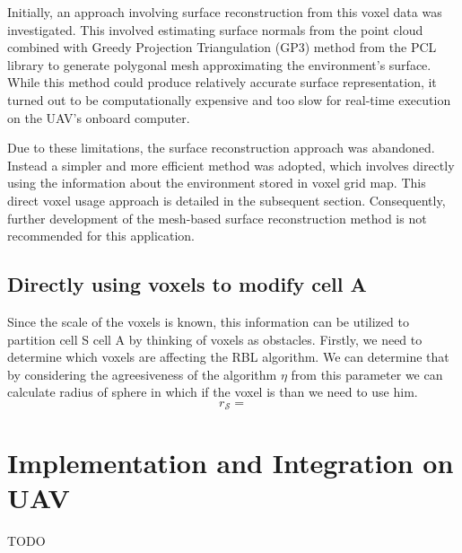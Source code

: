             Initially, an approach involving surface reconstruction from this voxel data was investigated. 
            This involved estimating surface normals from the point cloud combined with Greedy Projection Triangulation (GP3) method from the PCL library to generate polygonal mesh approximating the environment's surface.
            While this method could produce relatively accurate surface representation, it turned out to be computationally expensive and too slow for real-time execution on the \ac{UAV}'s onboard computer.

            Due to these limitations, the surface reconstruction approach was abandoned. 
            Instead a simpler and more efficient method was adopted, which involves directly using the information about the environment stored in voxel grid map.
            This direct voxel usage approach is detailed in the subsequent section. 
            Consequently, further development of the mesh-based surface reconstruction method is not recommended for this application.

        \subsection{Directly using voxels to modify cell A}
            Since the scale of the voxels is known, this information can be utilized to partition cell S cell A by thinking of voxels as obstacles.
            Firstly, we need to determine which voxels are affecting the RBL algorithm.
            We can determine that by considering the agreesiveness of the algorithm $\eta$ from this parameter we can calculate radius of sphere in which if the voxel is than we need to use him.
            \begin{equation}
                r_{\mathcal{S}} = 
            \end{equation}

    \section{Implementation and Integration on UAV}
        TODO
